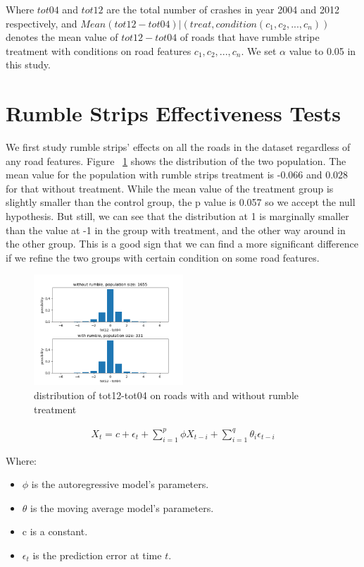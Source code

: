 \documentclass{article}
\begin{document}
Where $tot04$ and $tot12$ are the total number of crashes in year 2004 and 2012 respectively, and $Mean(tot12-tot04)|(treat, condition(c_1, c_2, ..., c_n))$ denotes the mean value of $tot12-tot04$ of roads that have rumble stripe treatment with conditions on road features $c_1, c_2, ..., c_n$. We set $\alpha$ value to 0.05 in this study.

\section*{Rumble Strips Effectiveness Tests}

We first study rumble strips' effects on all the roads in the dataset regardless of any road features. Figure ~\ref{fig:general-effect} shows the distribution of the two population. The mean value for the population with rumble strips treatment is -0.066 and 0.028 for that without treatment. While the mean value of the treatment group is slightly smaller than the control group, the p value is 0.057 so we accept the null hypothesis. But still, we can see that the distribution at 1 is marginally smaller than the value at -1 in the group with treatment, and the other way around in the other group. This is a good sign that we can find a more significant difference if we refine the two groups with certain condition on some road features.

\begin{figure}[h!]
    \centering
    \includegraphics[width=0.5\textwidth]{with-and-without-rumble-diff.png}
    \caption{distribution of tot12-tot04 on roads with and without rumble treatment}
    \label{fig:general-effect}
\end{figure}

\begin{align*}
    X_t=c+\epsilon_t+\sum_{i=1}^p\phi X_{t-i}+\sum_{i=1}^q\theta_i\epsilon_{t-i}
\end{align*}

Where:
\begin{itemize}
    \item $\phi$ is the autoregressive model's parameters.
    \item $\theta$ is the moving average model's parameters.
    \item c is a constant.
    \item $\epsilon_t$ is the prediction error at time $t$.
\end{itemize}
\end{document}
